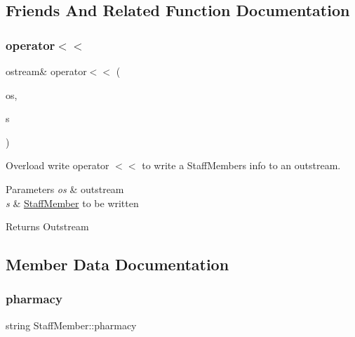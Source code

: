 \subsection{Friends And Related Function Documentation}
\mbox{\label{classStaffMember_a439f44a9fdf5a48fddf42d0929184c9a}} 
\subsubsection{\texorpdfstring{operator$<$$<$}{operator<<}}
{\footnotesize\ttfamily ostream\& operator$<$$<$ (\begin{DoxyParamCaption}\item[{ostream \&}]{os,  }\item[{const \hyperlink{classStaffMember}{Staff\+Member} \&}]{s }\end{DoxyParamCaption})\hspace{0.3cm}{\ttfamily [friend]}}



Overload write operator $<$$<$ to write a Staff\+Members info to an outstream. 


\begin{DoxyParams}{Parameters}
{\em os} & outstream\\
\hline
{\em s} & \hyperlink{classStaffMember}{Staff\+Member} to be written\\
\hline
\end{DoxyParams}
\begin{DoxyReturn}{Returns}
Outstream 
\end{DoxyReturn}


\subsection{Member Data Documentation}
\mbox{\label{classStaffMember_a20cb40d4d2b8b26070b853fb4ab68ddf}} 
\subsubsection{\texorpdfstring{pharmacy}{pharmacy}}
{\footnotesize\ttfamily string Staff\+Member\+::pharmacy\hspace{0.3cm}{\ttfamily [private]}}



